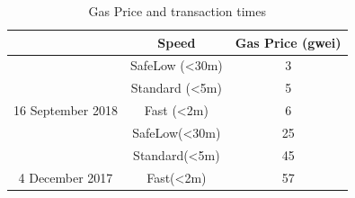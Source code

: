 \begin{table}[h]
\centering
\begin{tabular}{|c|c|c|}
\hline
\rowcolor[HTML]{5B82BA} 
\multicolumn{1}{|l|}{\cellcolor[HTML]{5B82BA}{\color[HTML]{FFFFFF} \textbf{Date}}} & {\color[HTML]{EFEFEF} \textbf{Speed}} & {\color[HTML]{EFEFEF} \textbf{Gas Price (gwei)}} \\ \hline
                                                                                   & SafeLow (\textless{}30m)              & 3                                                \\ \cline{2-3} 
                                                                                   & Standard (\textless{}5m)              & 5                                                \\ \cline{2-3} 
\multirow{-3}{*}{16 September 2018}                                       & Fast (\textless{}2m)                  & 6                                                \\ \hline
                                                                                   & SafeLow(\textless{}30m)               & 25                                               \\ \cline{2-3} 
                                                                                   & Standard(\textless{}5m)               & 45                                               \\ \cline{2-3} 
\multirow{-3}{*}{4 December 2017}                                         & Fast(\textless{}2m)                   & 57                                               \\ \hline
\end{tabular}%
\caption {Gas Price and transaction times}
\label{table:t2}
\end{table}
\vspace{0.5cm}
